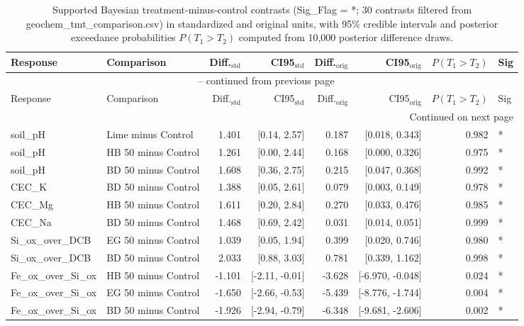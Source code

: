 \documentclass[preprint,12pt]{elsarticle}
\begin{document}
\begin{landscape}
\newpage

\begin{longtable}{llrrrrrl}
\caption{Supported Bayesian treatment-minus-control contrasts (Sig_Flag = *; 30 contrasts filtered from geochem_tmt_comparison.csv) in standardized and original units, with 95\% credible intervals and posterior exceedance probabilities $P(T_1 > T_2)$ computed from 10,000 posterior difference draws.}\\
\toprule
Response & Comparison & Diff.$_{\text{std}}$ & CI95$_{\text{std}}$ & Diff.$_{\text{orig}}$ & CI95$_{\text{orig}}$ & $P(T_1 > T_2)$ & Sig \\
\midrule
\endfirsthead
\multicolumn{8}{c}{{\tablename\ \thetable{} -- continued from previous page}} \\
\toprule
Response & Comparison & Diff.$_{\text{std}}$ & CI95$_{\text{std}}$ & Diff.$_{\text{orig}}$ & CI95$_{\text{orig}}$ & $P(T_1 > T_2)$ & Sig \\
\midrule
\endhead
\midrule \multicolumn{8}{r}{{Continued on next page}} \\ \endfoot
\bottomrule \endlastfoot
soil\_pH & Lime minus Control & 1.401 & [0.14, 2.57] & 0.187 & [0.018, 0.343] & 0.982 & * \\
soil\_pH & HB 50 minus Control & 1.261 & [0.00, 2.44] & 0.168 & [0.000, 0.326] & 0.975 & * \\
soil\_pH & BD 50 minus Control & 1.608 & [0.36, 2.75] & 0.215 & [0.047, 0.368] & 0.992 & * \\
CEC\_K & BD 50 minus Control & 1.388 & [0.05, 2.61] & 0.079 & [0.003, 0.149] & 0.978 & * \\
CEC\_Mg & HB 50 minus Control & 1.611 & [0.20, 2.84] & 0.270 & [0.033, 0.476] & 0.985 & * \\
CEC\_Na & BD 50 minus Control & 1.468 & [0.69, 2.42] & 0.031 & [0.014, 0.051] & 0.999 & * \\
Si\_ox\_over\_DCB & EG 50 minus Control & 1.039 & [0.05, 1.94] & 0.399 & [0.020, 0.746] & 0.980 & * \\
Si\_ox\_over\_DCB & BD 50 minus Control & 2.033 & [0.88, 3.03] & 0.781 & [0.339, 1.162] & 0.998 & * \\
Fe\_ox\_over\_Si\_ox & HB 50 minus Control & -1.101 & [-2.11, -0.01] & -3.628 & [-6.970, -0.048] & 0.024 & * \\
Fe\_ox\_over\_Si\_ox & EG 50 minus Control & -1.650 & [-2.66, -0.53] & -5.439 & [-8.776, -1.744] & 0.004 & * \\
Fe\_ox\_over\_Si\_ox & BD 50 minus Control & -1.926 & [-2.94, -0.79] & -6.348 & [-9.681, -2.606] & 0.002 & * \\

\end{longtable}
\end{landscape}
\end{document}
